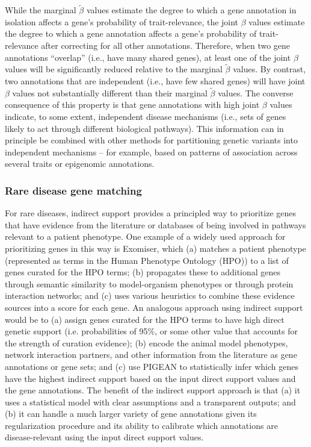 \documentclass[11pt]{article}
\begin{document}
While the marginal $\tilde{\beta}$ values estimate the degree to which
a gene annotation in isolation affects a gene's probability of
trait-relevance, the joint $\beta$ values estimate the degree to which
a gene annotation affects a gene's probability of trait-relevance
after correcting for all other annotations. Therefore, when two gene
annotations ``overlap'' (i.e., have many shared genes), at least one
of the joint $\beta$ values will be significantly reduced relative to
the marginal $\tilde{\beta}$ values. By contrast, two annotations that
are independent (i.e., have few shared genes) will have joint $\beta$
values not substantially different than their marginal $\tilde{\beta}$
values. The converse consequence of this property is that gene
annotations with high joint $\beta$ values indicate, to some extent,
independent disease mechanisms (i.e., sets of genes likely
to act through different biological pathways). This information can in
principle be combined with other methods for partitioning genetic
variants into independent mechanisms -- for example, based on patterns
of association across several traits\cite{udler} or epigenomic annotations\cite{price}.

\subsubsection{Rare disease gene matching}
For rare diseases, indirect support provides a principled way to
prioritize genes that have evidence from the literature or databases
of being involved in pathways relevant to a patient phenotype. One
example of a widely used approach for prioritizing genes in this way
is Exomiser, which (a) matches a patient phenotype (represented as
terms in the Human Phenotype Ontology (HPO)) to a list of genes curated
for the HPO terms; (b) propagates these to additional genes through
semantic similarity to model-organism phenotypes or through protein
interaction networks; and (c) uses various heuristics to combine these
evidence sources into a score for each gene. An analogous approach
using indirect support would be to (a) assign genes curated for the
HPO terms to have high direct genetic support (i.e. probabilities of
95\%, or some other value that accounts for the strength of curation
evidence); (b) encode the animal model phenotypes, network interaction
partners, and other information from the literature as gene
annotations or gene sets; and (c) use PIGEAN to statistically infer
which genes have the highest indirect support based on the input
direct support values and the gene annotations. The benefit of the
indirect support approach is that (a) it uses a statistical model with
clear assumptions and a transparent outputs; and (b) it can handle a
much larger variety of gene annotations given its regularization
procedure and its ability to calibrate which annotations are
disease-relevant using the input direct support values.
\end{document}
